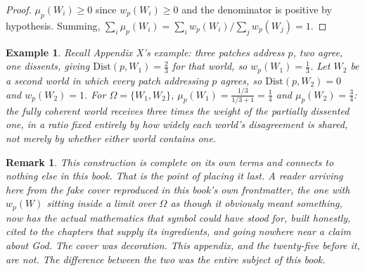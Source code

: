\documentclass[11pt]{book}
\newtheorem*{appendixremark}{Remark}
\newtheorem*{appendixexample}{Example}
\begin{document}
\begin{proof}
$\mu_p(W_i) \geq 0$ since $w_p(W_i) \geq 0$ and the denominator is positive by hypothesis. Summing, $\sum_i \mu_p(W_i) = \sum_i w_p(W_i) / \sum_j w_p(W_j) = 1$.
\end{proof}

\begin{appendixexample}
Recall Appendix X's example: three patches address $p$, two agree, one dissents, giving $\mathrm{Dist}(p,W_1) = \tfrac23$ for that world, so $w_p(W_1) = \tfrac13$. Let $W_2$ be a second world in which every patch addressing $p$ agrees, so $\mathrm{Dist}(p,W_2) = 0$ and $w_p(W_2) = 1$. For $\Omega = \{W_1, W_2\}$, $\mu_p(W_1) = \tfrac{1/3}{1/3 + 1} = \tfrac14$ and $\mu_p(W_2) = \tfrac34$: the fully coherent world receives three times the weight of the partially dissented one, in a ratio fixed entirely by how widely each world's disagreement is shared, not merely by whether either world contains one.
\end{appendixexample}

\begin{appendixremark}
This construction is complete on its own terms and connects to nothing else in this book. That is the point of placing it last. A reader arriving here from the fake cover reproduced in this book's own frontmatter, the one with $w_p(W)$ sitting inside a limit over $\Omega$ as though it obviously meant something, now has the actual mathematics that symbol could have stood for, built honestly, cited to the chapters that supply its ingredients, and going nowhere near a claim about God. The cover was decoration. This appendix, and the twenty-five before it, are not. The difference between the two was the entire subject of this book.
\end{appendixremark}
\end{document}
